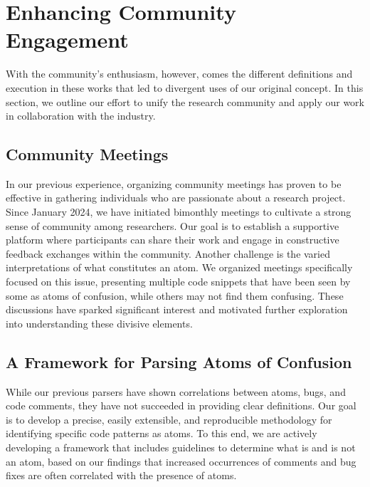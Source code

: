 \documentclass[conference]{IEEEtran}
\begin{document}
\section{Enhancing Community Engagement}

With the community's enthusiasm, however, comes the different definitions and execution in these works that led to divergent uses of our original concept. In this section, we outline our effort to unify the research community and apply our work in collaboration with the industry.

\subsection{Community Meetings}
In our previous experience, organizing community meetings has 
proven to be effective in gathering individuals who 
are passionate about a research project. 
Since January 2024, we have initiated bimonthly meetings 
to cultivate a strong sense of community among researchers. 
Our goal is to establish 
a supportive platform where  participants can share 
their work and engage in constructive feedback exchanges 
within the community.
%
%
Another challenge is the varied interpretations 
of what constitutes an atom. We organized 
meetings specifically focused on this issue, presenting 
multiple code snippets that have been seen by some as atoms of 
confusion, while others may not find them confusing. These 
discussions have sparked significant interest and motivated 
further exploration into understanding these divisive 
elements.


\subsection{A Framework for Parsing Atoms of Confusion}

While our previous parsers \cite{gopstein2018prevalence} 
have shown correlations between atoms, bugs, and 
code comments, they have not succeeded in providing clear 
definitions. Our goal is to develop a precise, easily 
extensible, and reproducible methodology for identifying
specific code patterns as atoms. To this end, we are actively 
developing a framework that includes guidelines 
to determine what is and is not an atom, based on our findings that increased occurrences of comments and bug fixes are often 
correlated with the presence of atoms. 
\end{document}
